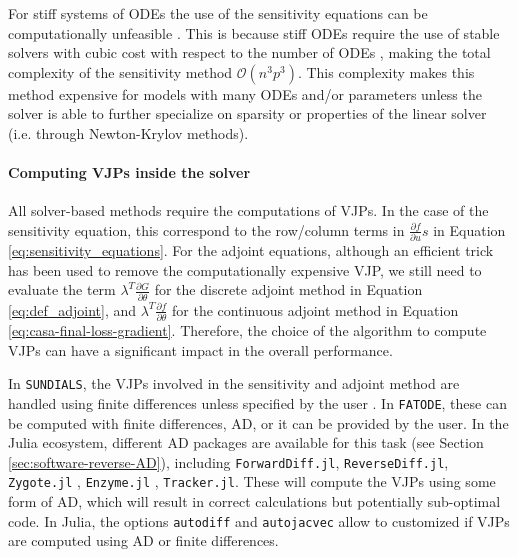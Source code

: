 For stiff systems of ODEs the use of the sensitivity equations can be computationally unfeasible \cite{kim_stiff_2021}.
This is because stiff ODEs require the use of stable solvers with cubic cost with respect to the number of ODEs \cite{hairer-solving-2}, making the total complexity of the sensitivity method $\mathcal{O}(n^3p^3)$. 
This complexity makes this method expensive for models with many ODEs and/or parameters unless the solver is able to further specialize on sparsity or properties of the linear solver (i.e. through Newton-Krylov methods). 

\paragraph{Computing VJPs inside the solver}
\label{section:computing-vjp-inside-solver}

All solver-based methods require the computations of VJPs. 
In the case of the sensitivity equation, this correspond to the row/column terms in $\frac{\partial f}{\partial u} s $ in Equation \eqref{eq:sensitivity_equations}.
For the adjoint equations, although an efficient trick has been used to remove the computationally expensive VJP, we still need to evaluate the term $\lambda^T \frac{\partial G}{\partial \theta}$ for the discrete adjoint method in Equation \eqref{eq:def_adjoint}, and $\lambda^T \frac{\partial f}{\partial \theta}$ for the continuous adjoint method in Equation \eqref{eq:casa-final-loss-gradient}. 
Therefore, the choice of the algorithm to compute VJPs can have a significant impact in the overall performance. 

In \texttt{SUNDIALS}, the VJPs involved in the sensitivity and adjoint method are handled using finite differences unless specified by the user \cite{SUNDIALS-hindmarsh2005sundials}.
In \texttt{FATODE}, these can be computed with finite differences, AD, or it can be provided by the user.
In the Julia ecosystem, different AD packages are available for this task (see Section \ref{sec:software-reverse-AD}), including \texttt{ForwardDiff.jl}, \texttt{ReverseDiff.jl}, \texttt{Zygote.jl} \cite{Innes_Zygote}, \texttt{Enzyme.jl} \cite{moses_Enzyme}, \texttt{Tracker.jl}.
These will compute the VJPs using some form of AD, which will result in correct calculations but potentially sub-optimal code. 
In Julia, the options \texttt{autodiff} and \texttt{autojacvec} allow to customized if VJPs are computed using AD or finite differences.  

